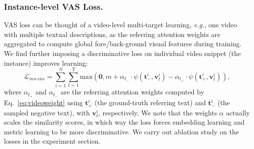 \subsubsection{Instance-level VAS Loss.}
VAS loss can be thought of a video-level multi-target learning,
\emph{e.g.}, one video with multiple textual descriptions, 
as the referring attention weights are aggregated to compute global
fore/back-ground visual features during training. 
We find further imposing a discriminative loss on individual video snippet (the instance) improves learning:
    \begin{equation}
    \label{ins-vas}
    \mathcal{L}_{ins\text{-}vas} = \sum ^{N}_{i=1}\sum^{T}_{t=1}\text{max}(\mathbf{0}, m + \alpha_{t_-}\cdot\psi(\boldsymbol{t}^i_-, \boldsymbol{v}_t^i) - \alpha_{t_+}\cdot\psi(\boldsymbol{t}^i_+, \boldsymbol{v}_t^i)),
    \end{equation}
where $\alpha_{t_+}$ and $\alpha_{t_-}$ are the referring attention weights computed by Eq.~\ref{eq:videoweight} using $\boldsymbol{t}^i_+$ (the ground-truth referring text) and $\boldsymbol{t}^i_-$ (the sampled negative text), with $\boldsymbol{v}_t^i$, 
respectively. 
We note that the weights $\alpha$ actually scales the similarity scores,
in which way the loss forces embedding learning and metric learning to be more discriminative.
We carry out ablation study on the losses in the experiment section.








